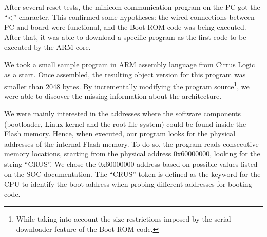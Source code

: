 \documentclass[conference]{IEEEtran}
\newcommand{\revisar}[1]{}
\newcommand{\nota}[1]{}
\begin{document}
After several reset tests, the minicom communication program on the PC got the ``\textless'' character. This confirmed some hypotheses: the wired connections between PC and board were functional, and the Boot ROM code was being executed. After that, it was able to download a specific program as the first code to be executed by the ARM core.


\nota{Posteriormente, preparamos un pequeño programa en lenguaje ensamblador que no supere
los 2048 bytes, y que nos permita ejecutar instrucciones en la CPU del 
ENTC-1000. Tomamos como base un ejemplo publicado por Cirrus, y lo modificamos
para realizar las pruebas con respecto a la información que
nos faltaba por conocer.}

We took a small sample program in ARM assembly language from Cirrus Logic as a start. Once assembled, the resulting object version for this program was smaller than 2048 bytes. By incrementally modifying the program source\footnote{While taking into account the size restrictions imposed by the serial downloader feature of the Boot ROM code.}, we were able to discover the missing information about the architecture. \revisar{, and
it fits the size restrictions imposed by the the serial downloader feature
of the Boot ROM code.} 

\nota{En particular, hicimos que nuestro pequeño programa encontrara
la dirección física de la memoria Flash interna.
El interés por encontrar esta dirección
base, es porque en esta memoria residen los componentes de software: 
gestor de arranque, el kernel Linux, y el sistemas de archivos raíz.}

We were mainly interested in the addresses where the software components
(bootloader, Linux kernel and the root file system) could be found inside the
Flash memory. Hence, when executed, our program looks for the physical 
addresses of the internal Flash memory. To do so, the program reads consecutive
memory locations, starting from the physical address  0x60000000, looking for the string ``CRUS''.
We chose the 0x60000000 address based on possible values listed on the SOC documentation.
The ``CRUS'' token is defined as the keyword for the CPU to identify 
the boot address when probing different addresses for booting code.


\nota{Para lograr el cometido, enviamos nuestro programa en los 2048 bytes
que el sistema lee desde el arranque vía ``download en serie''.
Nuestro programa leyó bytes
de direcciones consecutivas, comenzando en la dirección 0x60000000 (que
tomamos como referencia del manual de Cirrus).
Encontramos la dirección base de la memoria Flash en 
la dirección 0x60001000, ya que el programa leyó la palabra ``CRUS''
en cuatro bytes consecutivos. Esos cuatro bytes ``CRUS'' indican el inicio
del software de arranque, ya que está especificado en el manual
de la programación del SOC.}
\end{document}
